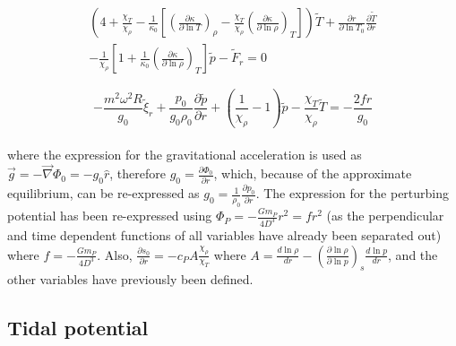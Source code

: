 \documentclass[11pt]{amsart}
\begin{document}
\begin{multline} \label{eq:flux_osc_dim}
\left( 4 + \frac{\chi_{T}}{\chi_{\rho}}  - \frac{1}{\kappa_{0}} \left[ \left( \frac{\partial \kappa}{\partial \ln T} \right)_{\rho} - \frac{\chi_{T}}{\chi_{\rho}} \left( \frac{\partial \kappa}{\partial \ln \rho} \right)_{T} \right] \right) \tilde{T} + \frac{\partial r}{\partial \ln T_{0}} \frac{\partial \tilde{T}}{\partial r}  \\
- \frac{1}{\chi_{\rho}} \left[ 1 + \frac{1}{\kappa_{0}} \left( \frac{\partial \kappa}{\partial \ln \rho} \right)_{T} \right] \tilde{p}
- \tilde{F}_{r}
=
0
\end{multline}

\begin{equation} \label{eq:mom_osc_dim}
- \frac{m^{2} \omega^{2} R }{g_{0}} \tilde{\xi}_{r} 
+ \frac{p_{0}}{g_{0} \rho_{0}} \frac{\partial \tilde{p}}{\partial r} + \left( \frac{1}{\chi_{\rho}} -  1 \right) \tilde{p}
- \frac{\chi_{T}}{\chi_{\rho}} \tilde{T}
=
- \frac{2 f r}{g_{0}}
\end{equation}
\\

where the expression for the gravitational acceleration  is used as $\vec{g} = - \vec{\nabla}\Phi_{0} = - g_{0} \hat{r}$, therefore $g_{0} = \frac{\partial \Phi_{0}}{\partial r}$, which, because of the approximate equilibrium, can be re-expressed as $g_{0} = \frac{1}{\rho_{0}} \frac{\partial p_{0}}{\partial r}$.
The expression for the perturbing potential has been re-expressed using $\Phi_{P} = - \frac{G m_{P}}{4 D^{3}} r^{2} = f r^{2}$ (as the perpendicular and time dependent functions of all variables have already been separated out) where $f = - \frac{G m_{P}}{4 D^{3}}$.  Also, $\frac{\partial s_{0}}{\partial r} = - c_{P} A \frac{\chi_{\rho}}{\chi_{T}}$ where $A = \frac{d \ln \rho}{d r} - \left( \frac{\partial \ln \rho}{\partial \ln p} \right)_{s} \frac{d \ln p}{d r}$, and the other variables have previously been defined.


\subsection{Tidal potential}
\end{document}
